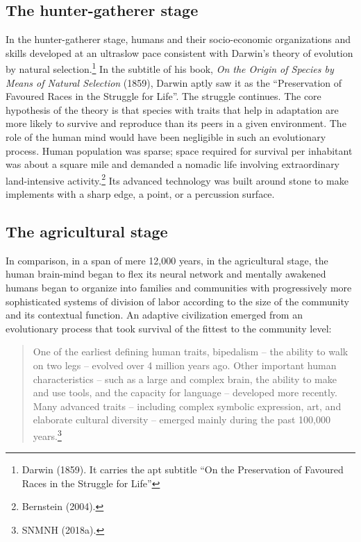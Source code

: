 \begin{multicols}{2}
\subsection{The hunter-gatherer stage}

In the hunter-gatherer stage, humans and their socio-economic organizations and skills developed at an ultraslow pace consistent with Darwin's theory of evolution by natural selection.\footnote{Darwin (1859). It carries the apt subtitle “On the Preservation of Favoured Races in the Struggle for Life”} In the subtitle of his book, \textit{On the Origin of Species by Means of Natural Selection} (1859), Darwin aptly saw it as the “Preservation of Favoured Races in the Struggle for Life”. The struggle continues. The core hypothesis of the theory is that species with traits that help in adaptation are more likely to survive and reproduce than its peers in a given environment. The role of the human mind would have been negligible in such an evolutionary process. Human population was sparse; space required for survival per inhabitant was about a square mile and demanded a nomadic life involving extraordinary land-intensive activity.\footnote{Bernstein (2004).} Its advanced technology was built around stone to make implements with a sharp edge, a point, or a percussion surface.

\subsection{The agricultural stage}

In comparison, in a span of mere 12,000 years, in the agricultural stage, the human brain-mind began to flex its neural network and mentally awakened humans began to organize into families and communities with progressively more sophisticated systems of division of labor according to the size of the community and its contextual function. An adaptive civilization emerged from an evolutionary process that took survival of the fittest to the community level:

\begin{quote}
One of the earliest defining human traits, bipedalism – the ability to walk on two legs – evolved over 4 million years ago. Other important human characteristics – such as a large and complex brain, the ability to make and use tools, and the capacity for language – developed more recently. Many advanced traits – including complex symbolic expression, art, and elaborate cultural diversity – emerged mainly during the past 100,000 years.\footnote{SNMNH (2018a).}
\end{quote}


\end{multicols}
